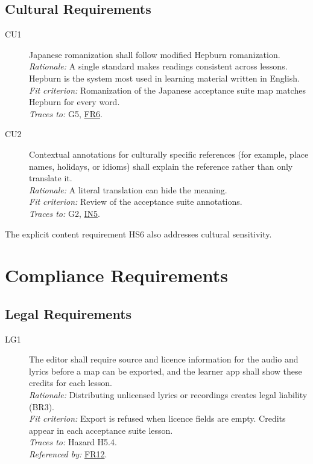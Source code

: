\documentclass[12pt]{article}
\newcommand{\rat}[1]{\\\textit{Rationale:} #1}
\newcommand{\fit}[1]{\\\textit{Fit criterion:} #1}
\newcommand{\trace}[1]{\\\textit{Traces to:} #1}
\newcommand{\usedby}[1]{\\\textit{Referenced by:} #1}
\newcommand{\reqdef}[1]{\hypertarget{req:#1}{#1}}
\newcommand{\req}[1]{\hyperlink{req:#1}{#1}}
\begin{document}
\subsection{Cultural Requirements}
\begin{description}
\item[\reqdef{CU1}] Japanese romanization shall follow modified Hepburn
romanization.
\rat{A single standard makes readings consistent across lessons. Hepburn is
the system most used in learning material written in English.}
\fit{Romanization of the Japanese acceptance suite map matches Hepburn for every
word.}
\trace{G5, \req{FR6}.}

\item[\reqdef{CU2}] Contextual annotations for culturally specific references (for
example, place names, holidays, or idioms) shall explain the reference rather
than only translate it.
\rat{A literal translation can hide the meaning.}
\fit{Review of the acceptance suite annotations.}
\trace{G2, \req{IN5}.}
\end{description}

The explicit content requirement HS6 also addresses cultural sensitivity.

\section{Compliance Requirements}
\subsection{Legal Requirements}
\begin{description}
\item[\reqdef{LG1}] The editor shall require source and licence information for the
audio and lyrics before a map can be exported, and the learner app shall show
these credits for each lesson.
\rat{Distributing unlicensed lyrics or recordings creates legal liability
(BR3).}
\fit{Export is refused when licence fields are empty. Credits appear in each
acceptance suite lesson.}
\trace{Hazard H5.4.}
\usedby{\req{FR12}.}
\end{description}
\end{document}
